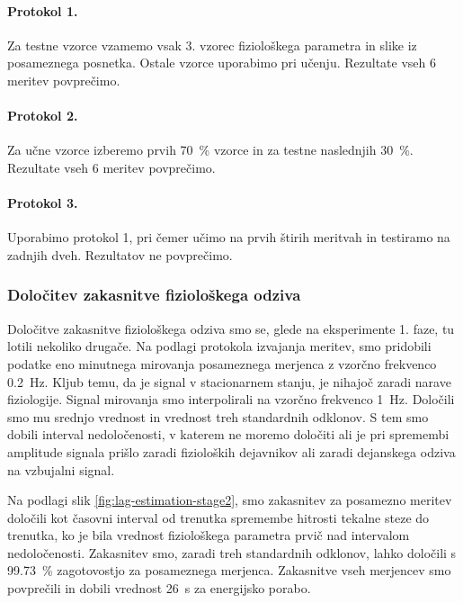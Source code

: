 \paragraph{Protokol 1.}
Za testne vzorce vzamemo vsak 3. vzorec fiziološkega parametra in slike iz posameznega posnetka. Ostale vzorce uporabimo pri učenju. Rezultate vseh 6 meritev povprečimo.

\paragraph{Protokol 2.}
Za učne vzorce izberemo prvih \SI{70}{\%} vzorce in za testne naslednjih \SI{30}{\%}. Rezultate vseh 6 meritev povprečimo.

\paragraph{Protokol 3.}
Uporabimo protokol 1, pri čemer učimo na prvih štirih meritvah in testiramo na zadnjih dveh. Rezultatov ne povprečimo.

\subsubsection{Določitev zakasnitve fiziološkega odziva}
Določitve zakasnitve fiziološkega odziva smo se, glede na eksperimente 1. faze, tu lotili nekoliko drugače. Na podlagi protokola izvajanja meritev, smo pridobili podatke eno minutnega mirovanja posameznega merjenca z vzorčno frekvenco \SI{0.2}{\hertz}. Kljub temu, da je signal v stacionarnem stanju, je nihajoč zaradi narave fiziologije. Signal mirovanja smo interpolirali na vzorčno frekvenco \SI{1}{\hertz}. Določili smo mu srednjo vrednost in vrednost treh standardnih odklonov. S tem smo dobili interval nedoločenosti, v katerem ne moremo določiti ali je pri spremembi amplitude signala prišlo zaradi fizioloških dejavnikov ali zaradi dejanskega odziva na vzbujalni signal. 

Na podlagi slik \ref{fig:lag-estimation-stage2}, smo zakasnitev za posamezno meritev določili kot časovni interval od trenutka spremembe hitrosti tekalne steze do trenutka, ko je bila vrednost fiziološkega parametra prvič nad intervalom nedoločenosti. Zakasnitev smo, zaradi treh standardnih odklonov, lahko določili s \SI{99.73}{\%} zagotovostjo za posameznega merjenca. Zakasnitve vseh merjencev smo povprečili in dobili vrednost \SI{26}{\s} za energijsko porabo.

